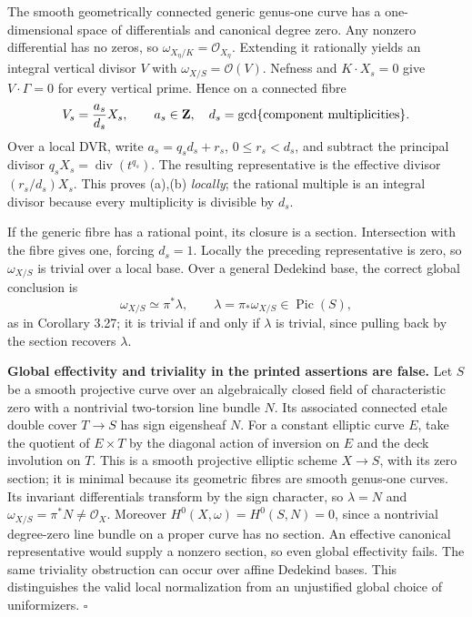 \documentclass[11pt]{article}
\let\chapterexercise\exercise
\renewcommand{\exercise}[2]{\Needspace{8\baselineskip}\chapterexercise{#1}{#2}}
\begin{document}
\pf The smooth geometrically connected generic genus-one curve has a one-dimensional space of differentials and canonical degree zero. Any nonzero differential has no zeros, so $\omega_{X_\eta/K}=\mathcal O_{X_\eta}$. Extending it rationally yields an integral vertical divisor $V$ with $\omega_{X/S}=\mathcal O(V)$. Nefness and $K\cdot X_s=0$ give $V\cdot\Gamma=0$ for every vertical prime. Hence on a connected fibre
\[ V_s=\frac{a_s}{d_s}X_s,\qquad a_s\in\mathbf Z,\quad
 d_s=\gcd\{\text{component multiplicities}\}. \]
Over a local DVR, write $a_s=q_sd_s+r_s$, $0\le r_s<d_s$, and subtract the principal divisor $q_sX_s=\operatorname{div}(t^{q_s})$. The resulting representative is the effective divisor $(r_s/d_s)X_s$. This proves (a),(b) \emph{locally}; the rational multiple is an integral divisor because every multiplicity is divisible by $d_s$.

If the generic fibre has a rational point, its closure is a section. Intersection with the fibre gives one, forcing $d_s=1$. Locally the preceding representative is zero, so $\omega_{X/S}$ is trivial over a local base. Over a general Dedekind base, the correct global conclusion is
\[ \omega_{X/S}\simeq\pi^*\lambda,\qquad
\lambda=\pi_*\omega_{X/S}\in\operatorname{Pic}(S), \]
as in Corollary 3.27; it is trivial if and only if $\lambda$ is trivial, since pulling back by the section recovers $\lambda$.

\textbf{Global effectivity and triviality in the printed assertions are false.} Let $S$ be a smooth projective curve over an algebraically closed field of characteristic zero with a nontrivial two-torsion line bundle $N$. Its associated connected etale double cover $T\to S$ has sign eigensheaf $N$. For a constant elliptic curve $E$, take the quotient of $E\times T$ by the diagonal action of inversion on $E$ and the deck involution on $T$. This is a smooth projective elliptic scheme $X\to S$, with its zero section; it is minimal because its geometric fibres are smooth genus-one curves. Its invariant differentials transform by the sign character, so $\lambda=N$ and $\omega_{X/S}=\pi^*N\ne\mathcal O_X$. Moreover $H^0(X,\omega)=H^0(S,N)=0$, since a nontrivial degree-zero line bundle on a proper curve has no section. An effective canonical representative would supply a nonzero section, so even global effectivity fails. The same triviality obstruction can occur over affine Dedekind bases. This distinguishes the valid local normalization from an unjustified global choice of uniformizers. \hfill$\square$
\end{document}
